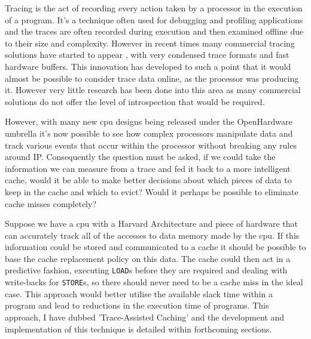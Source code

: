 Tracing is the act of recording every action taken by a processor in the execution of a program. It's a technique often used for debugging and profiling applications and the traces are often recorded during execution and then examined offline due to their size and complexity. However in recent times many commercial tracing solutions have started to appear \cite{CoreSightBaseSystem18, NiosIIProcessor2019}, with very condensed trace formats and fast hardware buffers. This innovation has developed to such a point that it would almost be possible to consider trace data online, as the processor was producing it. However very little research has been done into this area \cite{ponugotiEnablingOntheFlyHardware2019} as many commercial solutions do not offer the level of introspection that would be required.

However, with many new \gls{cpu} designs being released under the OpenHardware \cite{OpenSourceHardware} umbrella it's now possible to see how complex processors manipulate data and track various events that occur within the processor without breaking any rules around IP. Consequently the question must be asked, if we could take the information we can measure from a trace and fed it back to a more intelligent cache, would it be able to make better decisions about which pieces of data to keep in the cache and which to evict? Would it perhaps be possible to eliminate cache misses completely?

Suppose we have a \gls{cpu} with a Harvard Architecture and piece of hardware that can accurately track all of the accesses to data memory made by the \gls{cpu}. If this information could be stored and communicated to a cache it should be possible to base the cache replacement policy on this data. The cache could then act in a predictive fashion, executing \texttt{LOAD}s before they are required and dealing with write-backs for \texttt{STORE}s, so there should never need to be a cache miss in the ideal case. This approach would better utilise the available slack time within a program and lead to reductions in the execution time of programs. This approach, I have dubbed 'Trace-Assisted Caching' and the development and implementation of this technique is detailed within forthcoming sections.

